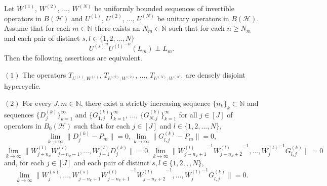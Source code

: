 \documentclass[10pt,a4paper]{amsart}
\begin{document}
\begin{theorem}\label{the5.1}
Let $W^{(1)}$, $W^{(2)}$, ..., $W^{(N)}$ be uniformly bounded sequences of invertible operators in $B(\mathcal{H})$ and $U^{(1)}$, $U^{(2)}$, ..., $U^{(N)}$ be unitary operators in $B(\mathcal{H})$. Assume that for each $m\in \mathbb{N}$ there exists an $N_{m}\in\mathbb{N}$ such that for each $n\geq N_{m}$ and each pair of distinct $s,l\in \{1,2, ..., N\}$
\begin{equation} \label{eq1}
{U^{(s)}}^{n}{U^{(l)}}^{-n}(L_{m})\perp L_{m}\tag{*}.
\end{equation}
Then the following assertions are equivalent.

$(1)$ The operators $T_{U^{(1)},W^{(1)}}$, $T_{U^{(2)},W^{(2)}}$, ..., $T_{U^{(N)},W^{(N)}}$ are densely disjoint hypercyclic.

$(2)$ For every $J,m \in\mathbb{N}$, there exist a strictly increasing sequence $\{n_{k}\}_{k}\subset\mathbb{N}$ and sequences
$\{D^{(k)}_{j}\}^{\infty}_{k=1}$ and $\{G^{(k)}_{1,j}\}^{\infty}_{k=1}$, ..., $\{G^{(k)}_{N,j}\}^{\infty}_{k=1}$
 for all $j\in [J]$ of operators in $B_{0}(\mathcal{H})$ such that for each $ j\in [J]$ and $l\in\{1,2,...,N\}$,
\[\lim_{k\rightarrow\infty}\|D^{(k)}_{j}-P_{m}\|=0, \lim_{k\rightarrow\infty}\|G^{(k)}_{l,j}-P_{m}\|=0,\]
\[\lim_{k\rightarrow\infty}\|W^{(l)}_{j+n_{k}}W^{(l)}_{j+n_{k}-1},...,W^{(l)}_{j+1}D^{(k)}_{j}\|=0,
\lim_{k\rightarrow\infty}\|{W^{(l)}_{j-n_{k}+1}}^{-1}{W^{(l)}_{j-n_{k}+2}}^{-1},...,{W^{(l)}_{j}}^{-1}G^{(k)}_{l,j}\|=0\]
 and, for each $j\in[J]$ and each pair of distinct $s,l\in \{1,2,,,N\}$,
 \[\lim_{k\rightarrow\infty}\|W^{(s)}_{j},...,W^{(s)}_{j-n_{k}+1}{W^{(l)}_{j-n_{k}+1}}^{-1}{W^{(l)}_{j-n_{k}+2}}^{-1},...,
 {W^{(l)}_{j}}^{-1}G^{(k)}_{l,j}\|=0.\]
\end{theorem}
\end{document}

